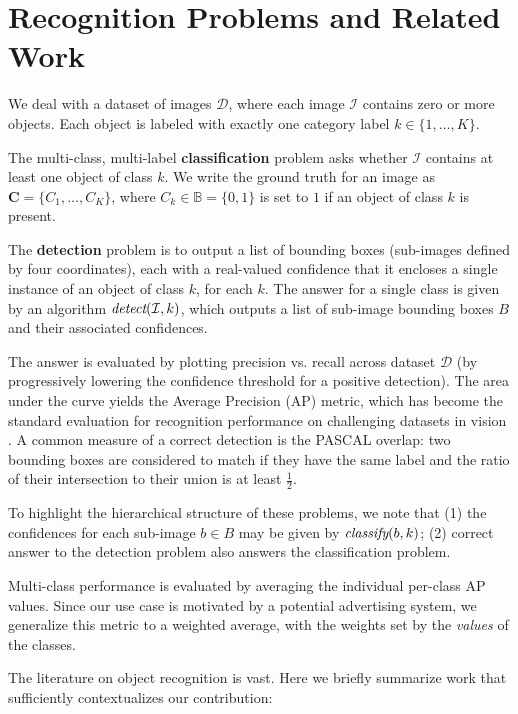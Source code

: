 \section{Recognition Problems and Related Work}

We deal with a dataset of images $\mathcal{D}$, where each image $\mathcal{I}$ contains zero or more objects.
Each object is labeled with exactly one category label $k \in \{1, \dots, K\}$.

The multi-class, multi-label \textbf{classification} problem asks whether $\mathcal{I}$ contains at least one object of class $k$.
We write the ground truth for an image as $\mathbf{C}=\{C_1,\dots,C_K\}$, where $C_k \in \mathbb{B} = \{0,1\}$ is set to $1$ if an object of class $k$ is present.

The \textbf{detection} problem is to output a list of bounding boxes (sub-images defined by four coordinates), each with a real-valued confidence that it encloses a single instance of an object of class $k$, for each $k$.
The answer for a single class is given by an algorithm $\emph{detect}(\mathcal{I},k)$, which outputs a list of sub-image bounding boxes $B$ and their associated confidences.

The answer is evaluated by plotting precision vs. recall across dataset $\mathcal{D}$ (by progressively lowering the confidence threshold for a positive detection).
The area under the curve yields the Average Precision (AP) metric, which has become the standard evaluation for recognition performance on challenging datasets in vision \cite{pascal-voc-2010}.
A common measure of a correct detection is the PASCAL overlap: two bounding boxes are considered to match if they have the same label and the ratio of their intersection to their union is at least $\frac{1}{2}$.

To highlight the hierarchical structure of these problems, we note that (1) the confidences for each sub-image $b \in B$ may be given by $\emph{classify}(b,k)$; (2) correct answer to the detection problem also answers the classification problem.

Multi-class performance is evaluated by averaging the individual per-class AP values.
Since our use case is motivated by a potential advertising system, we generalize this metric to a weighted average, with the weights set by the \emph{values} of the classes.

The literature on object recognition is vast.
Here we briefly summarize work that sufficiently contextualizes our contribution:

